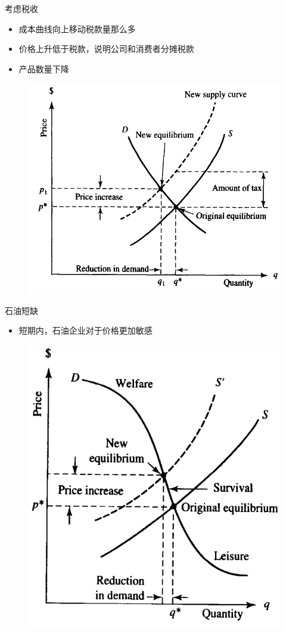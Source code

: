 \documentclass[mathserif, table]{beamer}
\begin{document}
\begin{frame}{考虑税收}
  \begin{itemize}
  \item 成本曲线向上移动税款量那么多
  \item 价格上升低于税款，说明公司和消费者分摊税款
  \item 产品数量下降
  \end{itemize}

  \begin{figure}
    \centering
    \includegraphics[width=.5\textwidth]{tax.png}
  \end{figure}
  
\end{frame}

\begin{frame}{石油短缺}
  \begin{itemize}
  \item 短期内，石油企业对于价格更加敏感
  \end{itemize}

  \begin{figure}
    \centering
    \includegraphics[width=.5\textwidth]{oo.png}
  \end{figure}

\end{frame}
\end{document}
